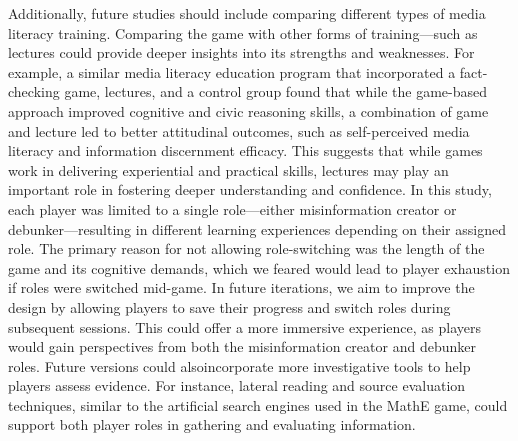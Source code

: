 Additionally, future studies should include comparing different types of media literacy training. Comparing the game with other forms of training—such as lectures could provide deeper insights into its strengths and weaknesses. For example, a similar media literacy education program that incorporated a fact-checking game, lectures, and a control group found that while the game-based approach improved cognitive and civic reasoning skills, a combination of game and lecture led to better attitudinal outcomes, such as self-perceived media literacy and information discernment efficacy\cite{yang2024designing}. This suggests that while games work in delivering experiential and practical skills, lectures may play an important role in fostering deeper understanding and confidence. %
In this study, each player was limited to a single role—either misinformation creator or debunker—resulting in different learning experiences depending on their assigned role. %
The primary reason for not allowing role-switching was the length of the game and its cognitive demands, which we feared would lead to player exhaustion if roles were switched mid-game. In future iterations, we aim to improve the design by allowing players to save their progress and switch roles during subsequent sessions. This could offer a more immersive experience, as players would gain perspectives from both the misinformation creator and debunker roles. Future versions could alsoincorporate more investigative tools to help players assess evidence. For instance, lateral reading and source evaluation techniques, similar to the artificial search engines used in the MathE game, could support both player roles in gathering and evaluating information.

